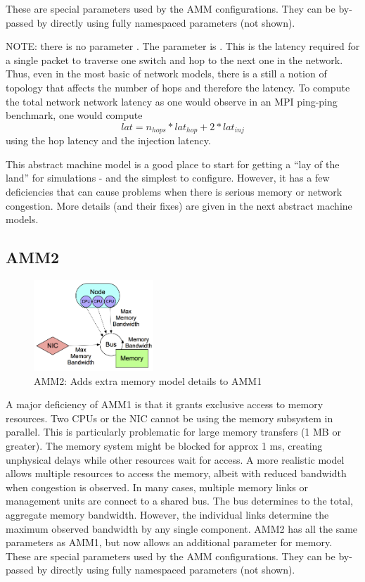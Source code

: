 These are special parameters used by the AMM configurations.
They can be by-passed by directly using fully namespaced parameters (not shown).

NOTE: there is no parameter .
The parameter is .
This is the latency required for a single packet to traverse one switch and hop to the next one in the network.
Thus, even in the most basic of network models, there is a still a notion of topology that affects the number of hops and therefore the latency.
To compute the total network network latency as one would observe in an MPI ping-ping benchmark, one would compute
\[
lat = n_{hops} * lat_{hop} + 2*lat_{inj}
\]
using the hop latency and the injection latency.

This abstract machine model is a good place to start for getting a ``lay of the land'' for simulations - and the simplest to configure.
However, it has a few deficiencies that can cause problems when there is serious memory or network congestion.
More details (and their fixes) are given in the next abstract machine models. 	

\subsection{AMM2}

\begin{figure}
\begin{center}
\includegraphics[width=0.4\textwidth]{figures/amm/amm2_membus.png}
\end{center}
\caption{AMM2: Adds extra memory model details to AMM1}
\label{fig:amm2}
\end{figure}

\label{subsec:ammTwo}
A major deficiency of AMM1 is that it grants exclusive access to memory resources.
Two CPUs or the NIC cannot be using the memory subsystem in parallel.
This is particularly problematic for large memory transfers (1 MB or greater).
The memory system might be blocked for approx 1 ms,
creating unphysical delays while other resources wait for access.
A more realistic model allows multiple resources to access the memory,
albeit with reduced bandwidth when congestion is observed.
In many cases, multiple memory links or management units are connect to a shared bus.
The bus determines to the total, aggregate memory bandwidth.
However, the individual links determine the maximum observed bandwidth by any single component.
AMM2 has all the same parameters as AMM1, but now allows an additional parameter for memory.
These are special parameters used by the AMM configurations.
They can be by-passed by directly using fully namespaced parameters (not shown).

